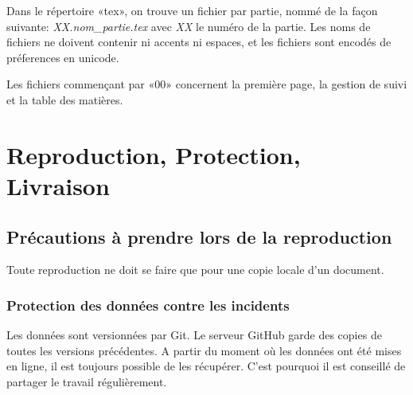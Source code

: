 \documentclass[twoside]{article}
\begin{document}
Dans le répertoire «tex», on trouve un fichier par partie, nommé de la façon suivante:
\textsl{XX.nom\_partie.tex} avec \textsl{XX} le numéro de la partie.
Les noms de fichiers ne doivent contenir ni accents ni espaces, et les fichiers
sont encodés de préferences en unicode.

Les fichiers commençant par «00» concernent la première page, la gestion de suivi
et la table des matières.


%


\section{Reproduction, Protection, Livraison}

\subsection{Précautions à prendre lors de la reproduction}
Toute reproduction ne doit se faire que pour une copie locale d'un document.

\subsubsection{Protection des données contre les incidents}
Les données sont versionnées par Git. Le serveur GitHub garde des copies de toutes les versions précédentes.
A partir du moment où les données ont été mises en ligne, il est toujours possible de les récupérer.
C'est pourquoi il est conseillé de partager le travail régulièrement.
\end{document}
